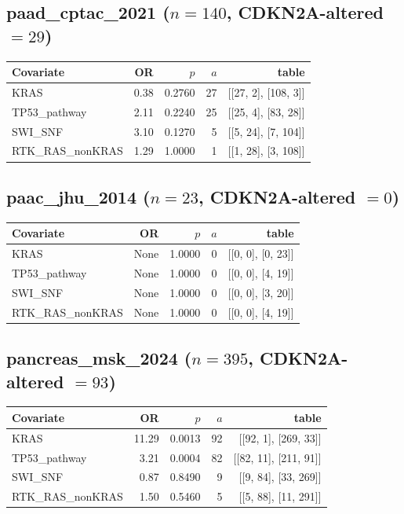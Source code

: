 \subsection{paad\_cptac\_2021 ($n=140$, CDKN2A-altered $=29$)}
\begin{center}\begin{tabular}{lrrrr}
\hline\hline Covariate & OR & $p$ & $a$ & table \\ \hline
KRAS & 0.38 & 0.2760 & 27 & [[27, 2], [108, 3]] \\
TP53\_pathway & 2.11 & 0.2240 & 25 & [[25, 4], [83, 28]] \\
SWI\_SNF & 3.10 & 0.1270 & 5 & [[5, 24], [7, 104]] \\
RTK\_RAS\_nonKRAS & 1.29 & 1.0000 & 1 & [[1, 28], [3, 108]] \\
\hline\hline\end{tabular}\end{center}
\subsection{paac\_jhu\_2014 ($n=23$, CDKN2A-altered $=0$)}
\begin{center}\begin{tabular}{lrrrr}
\hline\hline Covariate & OR & $p$ & $a$ & table \\ \hline
KRAS & None & 1.0000 & 0 & [[0, 0], [0, 23]] \\
TP53\_pathway & None & 1.0000 & 0 & [[0, 0], [4, 19]] \\
SWI\_SNF & None & 1.0000 & 0 & [[0, 0], [3, 20]] \\
RTK\_RAS\_nonKRAS & None & 1.0000 & 0 & [[0, 0], [4, 19]] \\
\hline\hline\end{tabular}\end{center}
\subsection{pancreas\_msk\_2024 ($n=395$, CDKN2A-altered $=93$)}
\begin{center}\begin{tabular}{lrrrr}
\hline\hline Covariate & OR & $p$ & $a$ & table \\ \hline
KRAS & 11.29 & 0.0013 & 92 & [[92, 1], [269, 33]] \\
TP53\_pathway & 3.21 & 0.0004 & 82 & [[82, 11], [211, 91]] \\
SWI\_SNF & 0.87 & 0.8490 & 9 & [[9, 84], [33, 269]] \\
RTK\_RAS\_nonKRAS & 1.50 & 0.5460 & 5 & [[5, 88], [11, 291]] \\
\hline\hline\end{tabular}\end{center}
